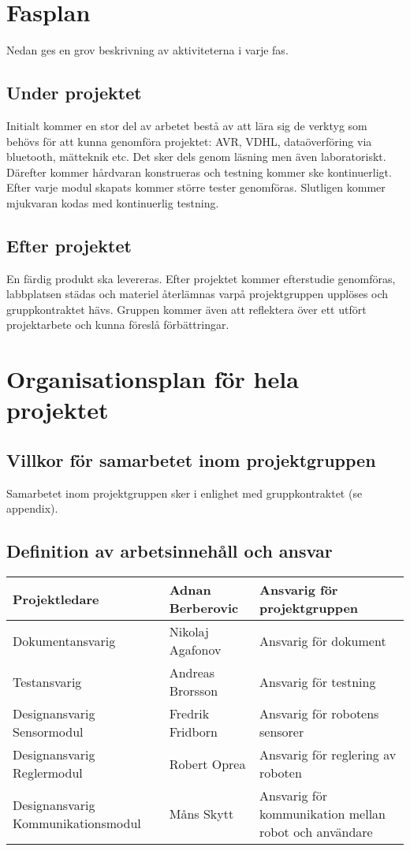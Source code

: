 \documentclass[11pt]{article}
\begin{document}
\begin{flushleft}
\section{Fasplan}
Nedan ges en grov beskrivning av aktiviteterna i varje fas.
\subsection{Under projektet}
Initialt kommer en stor del av arbetet bestå av att lära sig de verktyg som behövs för att kunna genomföra projektet: AVR, VDHL, dataöverföring via bluetooth, mätteknik etc. Det sker dels genom läsning men även laboratoriskt. Därefter kommer hårdvaran konstrueras och testning kommer ske kontinuerligt. Efter varje modul skapats kommer större tester genomföras. Slutligen kommer mjukvaran kodas med kontinuerlig testning.

\subsection{Efter projektet}
En färdig produkt ska levereras. Efter projektet kommer efterstudie genomföras, labbplatsen städas och materiel återlämnas varpå projektgruppen upplöses och gruppkontraktet hävs. Gruppen kommer även att reflektera över ett utfört projektarbete och kunna föreslå förbättringar.
\pagebreak

\section{Organisationsplan för hela projektet} 

\subsection{Villkor för samarbetet inom projektgruppen}
Samarbetet inom projektgruppen sker i enlighet med gruppkontraktet (se appendix).

\subsection{Definition av arbetsinnehåll och ansvar}

\begin{tabu} to 1.05\textwidth { | X[c] | X[c] | X[c] | }
\hline
Projektledare & Adnan Berberovic & Ansvarig för projektgruppen \\
\hline
Dokumentansvarig & Nikolaj Agafonov & Ansvarig för dokument\\
\hline
Testansvarig & Andreas Brorsson & Ansvarig för testning \\ 
\hline
Designansvarig Sensormodul & Fredrik Fridborn  & Ansvarig för robotens sensorer\\
\hline
Designansvarig Reglermodul & Robert Oprea & Ansvarig för reglering av roboten\\
\hline
Designansvarig Kommunikationsmodul & Måns Skytt & Ansvarig för kommunikation mellan robot och användare \\
\hline
 \end{tabu}


\end{flushleft}
\end{document}

